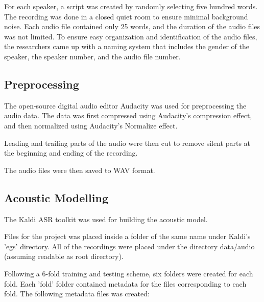For each speaker, a script was created by randomly selecting five hundred words. The recording was done in a closed quiet room to ensure minimal background noise. Each audio file contained only 25 words, and the duration of the audio files was not limited. To ensure easy organization and identification of the audio files, the researchers came up with a naming system that includes the gender of the speaker, the speaker number, and the audio file number.

\subsection{Preprocessing}
The open-source digital audio editor Audacity was used for preprocessing the audio data. The data was first compressed using Audacity's compression effect, and then normalized using Audacity's Normalize effect.

Leading and trailing parts of the audio were then cut to remove silent parts at the beginning and ending of the recording.

The audio files were then saved to WAV format.

\subsection{Acoustic Modelling}
The Kaldi ASR toolkit was used for building the acoustic model.

Files for the project was placed inside a folder of the same name under Kaldi's 'egs' directory. All of the recordings were placed under the directory data/audio (assuming readable as root directory).

Following a 6-fold training and testing scheme, six folders were created for each fold. Each 'fold' folder contained metadata for the files corresponding to each fold. The following metadata files was created:

